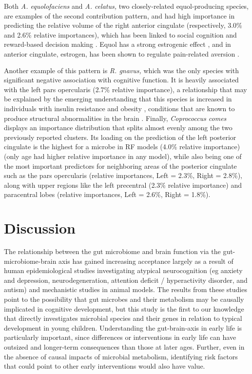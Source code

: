 \documentclass[a4paper]{article}
\begin{document}
Both \emph{A. equolofaciens} and \emph{A. celatus,} two closely-related
equol-producing species, are examples of the second contribution
pattern, and had high importance in predicting the relative volume of
the right anterior cingulate (respectively, 3.0\% and 2.6\% relative
importances), which has been linked to social cognition and reward-based
decision making
\cite{appsAnteriorCingulateGyrus2016,boesRightAnteriorCingulate2008,bushDorsalAnteriorCingulate2002}.
Equol has a strong estrogenic effect
\cite{setchellSEquolPotentLigand2005},
and in anterior cingulate, estrogen, has been shown to regulate
pain-related aversion
\cite{xiaoEstrogenAnteriorCingulate2013}.

Another example of this pattern is \emph{R. gnavus,} which was the only
species with significant negative association with cognitive function.
It is heavily associated with the left pars opercularis (2.7\% relative
importance), a relationship that may be explained by the emerging
understanding that this species is increased in individuals with insulin
resistance and obesity \cite{leyHumanGutMicrobes2006},
conditions that are known to produce structural abnormalities in the brain
\cite{opelBrainStructuralAbnormalities2021}.
Finally, \emph{Coprococcus comes} displays an importance
distribution that splits almost evenly among the two previously reported
clusters. Its loading on the prediction of the left posterior cingulate
is the highest for a microbe in RF models (4.0\% relative importance)
(only age had higher relative importance in any model), while also being
one of the most important predictors for neighboring areas of the
posterior cingulate such as the pars opercularis (relative importances,
Left = 2.3\%, Right = 2.8\%), along with upper regions like the left
precentral (2.3\% relative importance) and paracentral lobes (relative
importances, Left = 2.6\%, Right = 1.8\%).

\section*{Discussion}

The relationship between the gut microbiome and brain function via the
gut-microbiome-brain axis has gained increasing acceptance largely as a
result of human epidemiological studies investigating atypical
neurocognition (eg anxiety and depression, neurodegeneration, attention
deficit / hyperactivity disorder, and autism) and mechanistic studies in
animal models. The results from these studies point to the possibility
that gut microbes and their metabolism may be causally implicated in
cognitive development, but this study is the first to our knowledge that
directly investigates microbial species and their genes in relation to
typical development in young children. Understanding the gut-brain-axis
in early life is particularly important, since differences or
interventions in early life can have outsized and longer-term
consequences than those at later ages. Further, even in the absence of
causal impacts of microbial metabolism, identifying risk factors that
could point to other early interventions would also have value.
\end{document}
